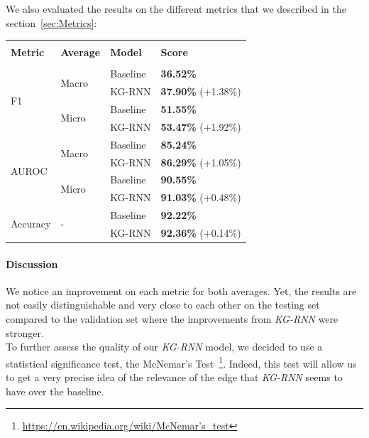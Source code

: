 We also evaluated the results on the different metrics that we described in the section~\ref{sec:Metrics}: \\
\begin{table}[H]
 \begin{center}
  \begin{tabular}{| p{2cm} | p{2cm} | p{2cm} | p{3cm} |}
   \hline
   &&&\\
   \textbf{Metric} & \textbf{Average} & \textbf{Model} & \textbf{Score} \\
   &&&\\ \hline
   \multirow{4}{*}{F1} & \multirow{2}{*}{Macro} & Baseline & \textbf{36.52\%} \\
   && KG-RNN & \textbf{37.90\%} (+1.38\%) \\ \cline{2-4}
   & \multirow{2}{*}{Micro} & Baseline & \textbf{51.55\%} \\
   && KG-RNN & \textbf{53.47\%} (+1.92\%) \\ \hline
   
   \multirow{4}{*}{AUROC} & \multirow{2}{*}{Macro} & Baseline & \textbf{85.24\%} \\
   && KG-RNN & \textbf{86.29\%} (+1.05\%) \\ \cline{2-4}
   & \multirow{2}{*}{Micro} & Baseline & \textbf{90.55\%} \\
   && KG-RNN & \textbf{91.03\%} (+0.48\%) \\ \hline
   
   \multirow{2}{*}{Accuracy} & \multirow{2}{*}{-} & Baseline & \textbf{92.22\%} \\
   && KG-RNN & \textbf{92.36\%} (+0.14\%) \\ \hline
  \end{tabular}
 \end{center}
\end{table}
\newpage
\paragraph{Discussion} We notice an improvement on each metric for both averages. Yet, the results are not easily distinguishable and very close to each other on the testing set compared to the validation set where the improvements from \textit{KG-RNN} were stronger. \\

To further assess the quality of our \emph{KG-RNN} model, we decided to use a statistical significance test, the McNemar's Test~\footnote{\href{https://en.wikipedia.org/wiki/McNemar\%27s\_test}{https://en.wikipedia.org/wiki/McNemar's\_test}}. Indeed, this test will allow us to get a very precise idea of the relevance of the edge that \emph{KG-RNN} seems to have over the baseline. \\

